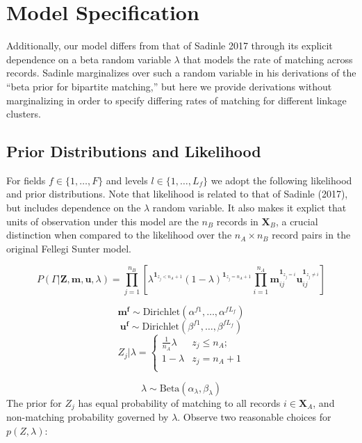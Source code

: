\documentclass[
  12pt,
]{article}
\begin{document}
\hypertarget{model-specification}{%
\section{Model Specification}\label{model-specification}}

Additionally, our model differs from that of Sadinle 2017 through its
explicit dependence on a beta random variable \(\lambda\) that models
the rate of matching across records. Sadinle marginalizes over such a
random variable in his derivations of the ``beta prior for bipartite
matching,'' but here we provide derivations without marginalizing in
order to specify differing rates of matching for different linkage
clusters.

\hypertarget{prior-distributions-and-likelihood}{%
\subsection{Prior Distributions and
Likelihood}\label{prior-distributions-and-likelihood}}

For fields \(f \in \{1, \ldots, F\}\) and levels
\(l\in \{1, \ldots, L_f\}\) we adopt the following likelihood and prior
distributions. Note that likelihood is related to that of Sadinle
(2017), but includes dependence on the \(\lambda\) random variable. It
also makes it explict that units of observation under this model are the
\(n_B\) records in \(\mathbf{X}_B\), a crucial distinction when compared
to the likelihood over the \(n_A \times n_B\) record pairs in the
original Fellegi Sunter model.

\[P(\Gamma|\mathbf{Z}, \mathbf{m}, \mathbf{u}, \lambda) =\prod_{j=1}^{n_B}  \left[\lambda^{\mathbf{1}_{z_j < n_A + 1}} (1-\lambda)^{\mathbf{1}_{z_j = n_A + 1}}\prod_{i=1}^{n_A}\mathbf{m}_{ij}^{\mathbf{1}_{z_j = i}}\mathbf{u}_{ij}^{\mathbf{1}_{z_j \neq i}}\right]\]

\[\mathbf{m^{f}} \sim \text{Dirichlet}(\alpha^{f1}, \ldots, \alpha^{fL_f})\]
\[\mathbf{u^{f}} \sim \text{Dirichlet}(\beta^{f1}, \ldots, \beta^{fL_f})\]
\[Z_j | \lambda =
\begin{cases} 
    \frac{1}{n_A}\lambda  & z_j \leq n_A; \\
     1-\lambda &  z_j  = n_A + 1 \\
\end{cases}\]

\[\lambda \sim \text{Beta}(\alpha_{\lambda}, \beta_{\lambda}) \] The
prior for \(Z_j\) has equal probability of matching to all records
\(i\in \mathbf{X}_A\), and non-matching probability governed by
\(\lambda\). Observe two reasonable choices for \(p(Z, \lambda)\):
\end{document}
